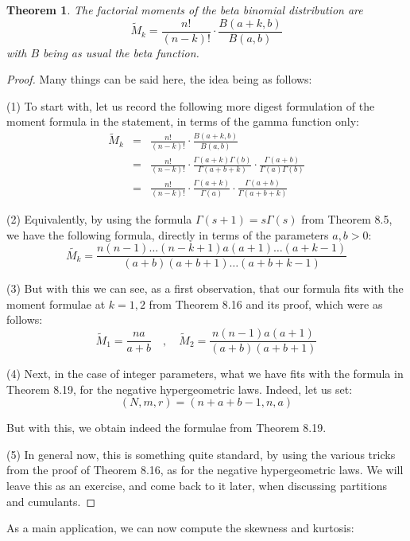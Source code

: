 \documentclass[12pt]{amsbook}
\newtheorem{theorem}{Theorem}[chapter]
\begin{document}
\begin{theorem}
The factorial moments of the beta binomial distribution are
$$\widetilde{M}_k=\frac{n!}{(n-k)!}\cdot\frac{B(a+k,b)}{B(a,b)}$$
with $B$ being as usual the beta function.
\end{theorem}

\begin{proof}
Many things can be said here, the idea being as follows:

\medskip

(1) To start with, let us record the following more digest formulation of the moment formula in the statement, in terms of the gamma function only:
\begin{eqnarray*}
\widetilde{M}_k
&=&\frac{n!}{(n-k)!}\cdot\frac{B(a+k,b)}{B(a,b)}\\
&=&\frac{n!}{(n-k)!}\cdot\frac{\Gamma(a+k)\Gamma(b)}{\Gamma(a+b+k)}\cdot\frac{\Gamma(a+b)}{\Gamma(a)\Gamma(b)}\\
&=&\frac{n!}{(n-k)!}\cdot\frac{\Gamma(a+k)}{\Gamma(a)}\cdot\frac{\Gamma(a+b)}{\Gamma(a+b+k)}
\end{eqnarray*}

(2) Equivalently, by using the formula $\Gamma(s+1)=s\Gamma(s)$ from Theorem 8.5, we have the following formula, directly in terms of the parameters $a,b>0$:
$$\widetilde{M_k}=\frac{n(n-1)\ldots(n-k+1)a(a+1)\ldots(a+k-1)}{(a+b)(a+b+1)\ldots(a+b+k-1)}$$

(3) But with this we can see, as a first observation, that our formula fits with the moment formulae at $k=1,2$ from Theorem 8.16 and its proof, which were as follows:
$$\widetilde{M}_1=\frac{na}{a+b}\quad,\quad 
\widetilde{M}_2=\frac{n(n-1)a(a+1)}{(a+b)(a+b+1)}$$

(4) Next, in the case of integer parameters, what we have fits with the formula in Theorem 8.19, for the negative hypergeometric laws. Indeed, let us set:
$$(N,m,r)=(n+a+b-1,n,a)$$

But with this, we obtain indeed the formulae from Theorem 8.19.

\medskip

(5) In general now, this is something quite standard, by using the various tricks from the proof of Theorem 8.16, as for the negative hypergeometric laws. We will leave this as an exercise, and come back to it later, when discussing partitions and cumulants.
\end{proof}

As a main application, we can now compute the skewness and kurtosis:
\end{document}
